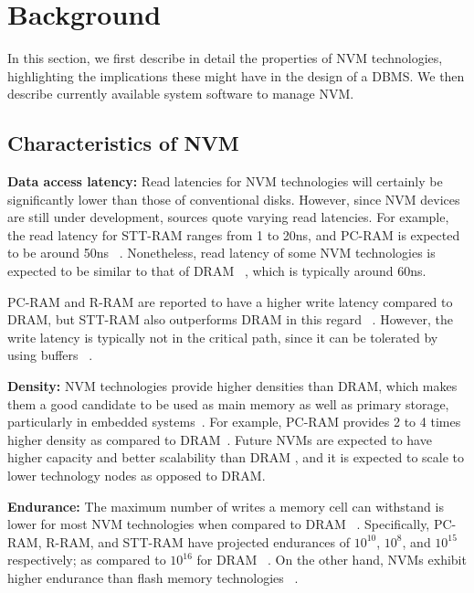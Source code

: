 \section{Background}
\label{sec:background}
\noindent In this section, we first describe in detail the properties of NVM technologies, highlighting the implications these might have in the design of a DBMS. We then describe currently available system software to manage NVM. 


\subsection{Characteristics of NVM}
\noindent \textbf{Data access latency:} Read latencies for NVM technologies will certainly be significantly lower than those of conventional disks. However, since NVM devices are still under development, sources quote varying read latencies. For example, the read latency for STT-RAM ranges from 1 to 20ns, and PC-RAM is expected to be around 50ns ~\cite{arulraj2015let,wang2013low,perez2010non}. Nonetheless, read latency of some NVM technologies is expected to be similar to that of DRAM ~\cite{mittal2016survey,arulraj2015let,wang2013low,chang2012limits,arulraj2016write,oukid2014sofort,chatzistergiou2015rewind}, which is typically around 60ns.

PC-RAM and R-RAM are reported to have a higher write latency compared to DRAM, but STT-RAM also outperforms DRAM in this regard ~\cite{arulraj2015let,wang2013low}. However, the write latency is typically not in the critical path, since it can be tolerated by using buffers ~\cite{qureshi2009scalable}.

\noindent\textbf{Density:} NVM technologies provide higher densities than DRAM, which makes them a good candidate to be used as main memory as well as primary storage, particularly in embedded systems~\cite{huang2012register}. For example, PC-RAM provides 2 to 4 times higher density as compared to DRAM~\cite{qureshi2009scalable}. Future NVMs are expected to have higher capacity and better scalability than DRAM \cite{oukid2015instant,chakrabarti2014atlas,zhang2015study,viglas2014write}
, and it is expected to scale to lower technology nodes as opposed to DRAM.

\noindent\textbf{Endurance:} The maximum number of writes a memory cell can withstand is lower for most NVM 
technologies when compared to DRAM ~\cite{qureshi2009scalable,zhou2009durable}. Specifically, PC-RAM, R-RAM, 
and STT-RAM have projected endurances of $10^{10}$, $10^{8}$, and $10^{15}$ respectively;  as compared to 
$10^{16}$ for DRAM ~\cite{arulraj2015let}. On the other hand, NVMs exhibit higher endurance than flash 
memory technologies ~\cite{wang2013low}.

